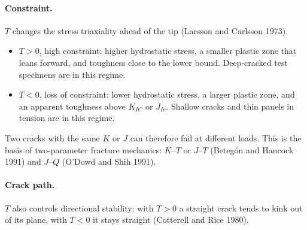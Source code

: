 \documentclass[11pt,a4paper]{article}
\begin{document}
\paragraph{Constraint.} $T$ changes the stress triaxiality ahead of the tip (Larsson and Carlsson 1973).
\begin{itemize}
  \item $T>0$, high constraint: higher hydrostatic stress, a smaller plastic zone that leans forward, and
  toughness close to the lower bound. Deep-cracked test specimens are in this regime.
  \item $T<0$, loss of constraint: lower hydrostatic stress, a larger plastic zone, and an apparent toughness
  above $K_{IC}$ or $J_{Ic}$. Shallow cracks and thin panels in tension are in this regime.
\end{itemize}
Two cracks with the same $K$ or $J$ can therefore fail at different loads. This is the basis of two-parameter
fracture mechanics: $K$--$T$ or $J$--$T$ (Beteg\'on and Hancock 1991) and $J$--$Q$ (O'Dowd and Shih 1991).

\paragraph{Crack path.} $T$ also controls directional stability: with $T>0$ a straight crack tends to kink
out of its plane, with $T<0$ it stays straight (Cotterell and Rice 1980).

\end{document}

